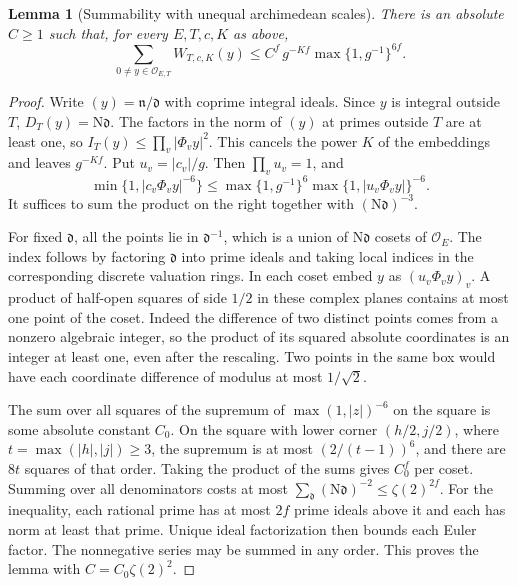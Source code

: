 \documentclass[a4paper,11pt]{article}
\newtheorem{lemma}[proposition]{Lemma}
\theoremstyle{definition}
\theoremstyle{remark}
\numberwithin{equation}{section}
\begin{document}
\begin{lemma}[Summability with unequal archimedean scales]\leavevmode
\label{lem:freqheight875}
There is an absolute \(C\ge1\) such that, for every \(E,T,c,K\) as above,
\[
 \sum_{0\ne y\in\mathcal O_{E,T}} W_{T,c,K}(y)
       \le C^f\,g^{-Kf}\max\{1,g^{-1}\}^{6f}.
\]
\end{lemma}
\begin{proof}
Write \((y)=\mathfrak n/\mathfrak d\) with coprime integral ideals.
Since \(y\) is integral outside \(T\), \(D_T(y)=\mathrm N\mathfrak d\).
The factors in the norm of \((y)\) at primes outside \(T\) are at least
one, so \(I_T(y)\le\prod_v|\Phi_v y|^2\). This cancels the power \(K\)
of the embeddings and leaves \(g^{-Kf}\).
Put \(u_v=|c_v|/g\). Then \(\prod_vu_v=1\), and
\[
 \min\{1,|c_v\Phi_v y|^{-6}\}
   \le \max\{1,g^{-1}\}^6\max\{1,|u_v\Phi_v y|\}^{-6}.
\]
It suffices to sum the product on the right together with
\((\mathrm N\mathfrak d)^{-3}\).

For fixed \(\mathfrak d\), all the points lie in
\(\mathfrak d^{-1}\), which is a union of \(\mathrm N\mathfrak d\)
cosets of \(\mathcal O_E\). The index follows by factoring \(\mathfrak d\)
into prime ideals and taking local indices in the corresponding discrete
valuation rings. In each coset embed \(y\) as \((u_v\Phi_v y)_v\).
A product of half-open squares of side \(1/2\) in these complex planes
contains at most one point of the coset. Indeed the difference of two
distinct points comes from a nonzero algebraic integer, so the product
of its squared absolute coordinates is an integer at least one, even
after the rescaling. Two points in the same box would have each
coordinate difference of modulus at most \(1/\sqrt2\).

The sum over all squares of the supremum of \(\max(1,|z|)^{-6}\)
on the square is some absolute constant \(C_0\). On the square with
lower corner \((h/2,j/2)\), where \(t=\max(|h|,|j|)\ge3\), the
supremum is at most \((2/(t-1))^6\), and there are \(8t\) squares
of that order. Taking the product of the sums gives \(C_0^f\) per
coset. Summing over all denominators costs at most
\(\sum_{\mathfrak d}(\mathrm N\mathfrak d)^{-2}
 \le\zeta(2)^{2f}\).
For the inequality, each rational prime has at most \(2f\) prime ideals
above it and each has norm at least that prime. Unique ideal
factorization then bounds each Euler factor. The nonnegative series
may be summed in any order. This proves the lemma with
\(C=C_0\zeta(2)^2\).
\end{proof}
\end{document}
